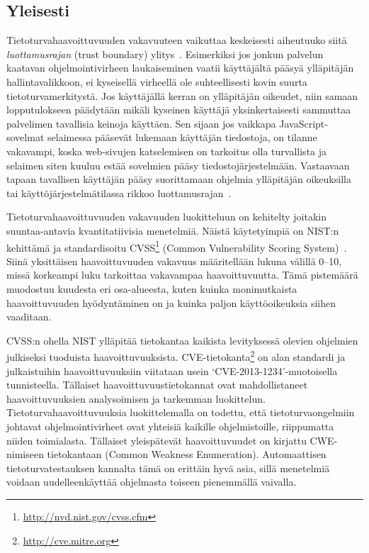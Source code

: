 \subsection{Yleisesti}
Tietoturvahaavoittuvuuden vakavuuteen vaikuttaa keskeisesti aiheutuuko siitä \emph{luottamusrajan}
(trust boundary) ylitys~\cite{ViolatingAssumptions}.
Esimerkiksi jos jonkun palvelun kaatavan ohjelmointivirheen laukaiseminen vaatii käyttäjältä pääsyä
ylläpitäjän hallintavalikkoon, ei kyseisellä virheellä ole suhteellisesti kovin suurta tietoturvamerkitystä.
Jos käyttäjällä kerran on ylläpitäjän oikeudet, niin samaan lopputulokseen päädytään mikäli kyseinen
käyttäjä yksinkertaisesti sammuttaa palvelimen tavallisia keinoja käyttäen.
Sen sijaan jos vaikkapa JavaScript-sovelmat selaimessa pääsevät lukemaan käyttäjän tiedostoja,
on tilanne vakavampi,
koska web-sivujen katselemisen on tarkoitus olla turvallista ja selaimen siten
kuuluu estää sovelmien pääsy tiedostojärjestelmään.
Vastaavaan tapaan tavallisen käyttäjän pääsy suorittamaan ohjelmia ylläpitäjän oikeuksilla
tai käyttöjärjestelmätilassa rikkoo luottamusrajan~\cite{ViolatingAssumptions}.

Tietoturvahaavoittuvuuden vakavuuden luokitteluun on kehitelty joitakin suuntaa-antavia kvantitatiivisia menetelmiä.
Näistä käytetyimpiä on NIST:n kehittämä ja standardisoitu CVSS\footnote{\url{http://nvd.nist.gov/cvss.cfm}} (Common Vulnerability Scoring System)~\cite{CVSS}.
Siinä yksittäisen haavoittuvuuden vakavuus määritellään lukuna välillä 0--10,
missä korkeampi luku tarkoittaa vakavampaa haavoittuvuutta.
Tämä pistemäärä muodostuu kuudesta eri osa-alueesta,
kuten kuinka monimutkaista haavoittuvuuden hyödyntäminen on ja kuinka paljon käyttöoikeuksia siihen vaaditaan.

CVSS:n ohella NIST ylläpitää tietokantaa kaikista levityksessä olevien ohjelmien julkiseksi tuoduista haavoittuvuuksista.
CVE-tietokanta\footnote{\url{http://cve.mitre.org}} on alan standardi ja julkaistuihin haavoittuvuuksiin viitataan usein `CVE-2013-1234'-muotoisella tunnisteella.
Tällaiset haavoittuvuustietokannat ovat mahdollistaneet haavoittuvuuksien analysoimisen ja tarkemman luokittelun.
Tietoturvahaavoittuvuuksia luokittelemalla on todettu,
että tietoturvaongelmiin johtavat ohjelmointivirheet ovat yhteisiä kaikille ohjelmistoille,
riippumatta niiden toimialasta.
Tällaiset yleispätevät haavoittuvuudet on kirjattu CWE-nimiseen tietokantaan (Common Weakness Enumeration).
Automaattisen tietoturvatestauksen kannalta tämä on erittäin hyvä asia,
sillä menetelmiä voidaan uudelleenkäyttää ohjelmasta toiseen pienemmällä vaivalla.

